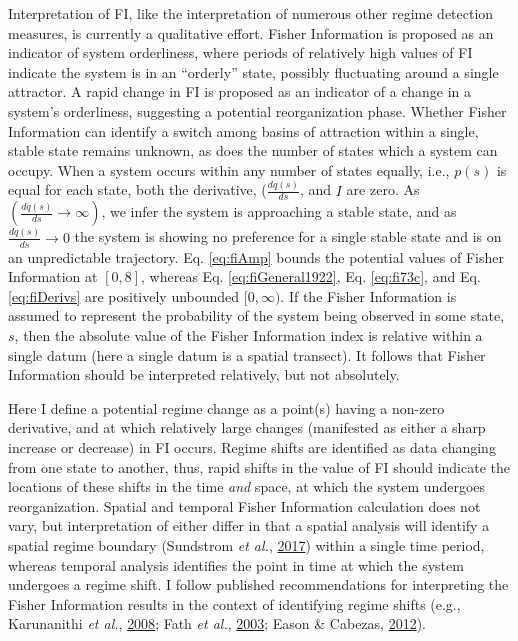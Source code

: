 \documentclass[12pt,twoside,openany]{reedthesis}
\begin{document}
Interpretation of FI, like the interpretation of numerous other regime detection measures, is currently a qualitative effort. Fisher Information is proposed as an indicator of system orderliness, where periods of relatively high values of FI indicate the system is in an ``orderly'' state, possibly fluctuating around a single attractor. A rapid change in FI is proposed as an indicator of a change in a system's orderliness, suggesting a potential reorganization phase. Whether Fisher Information can identify a switch among basins of attraction within a single, stable state remains unknown, as does the number of states which a system can occupy. When a system occurs within any number of states equally, i.e., \(p(s)\) is equal for each state, both the derivative, (\(\frac{dq(s)}{ds}\), and \(I\) are zero. As \((\frac{dq(s)}{ds} \rightarrow \infty)\), we infer the system is approaching a stable state, and as \(\frac{dq(s)}{ds} \rightarrow 0\) the system is showing no preference for a single stable state and is on an unpredictable trajectory. Eq. \eqref{eq:fiAmp} bounds the potential values of Fisher Information at \([0, 8]\), whereas Eq. \eqref{eq:fiGeneral1922}, Eq. \eqref{eq:fi73c}, and Eq. \eqref{eq:fiDerivs} are positively unbounded \([0, \infty)\). If the Fisher Information is assumed to represent the probability of the system being observed in some state, \(s\), then the absolute value of the Fisher Information index is relative within a single datum (here a single datum is a spatial transect). It follows that Fisher Information should be interpreted relatively, but not absolutely.

Here I define a potential regime change as a point(s) having a non-zero derivative, and at which relatively large changes (manifested as either a sharp increase or decrease) in FI occurs. Regime shifts are identified as data changing from one state to another, thus, rapid shifts in the value of FI should indicate the locations of these shifts in the time \emph{and} space, at which the system undergoes reorganization. Spatial and temporal Fisher Information calculation does not vary, but interpretation of either differ in that a spatial analysis will identify a spatial regime boundary (Sundstrom \emph{et al.}, \protect\hyperlink{ref-sundstrom2017detecting}{2017}) within a single time period, whereas temporal analysis identifies the point in time at which the system undergoes a regime shift. I follow published recommendations for interpreting the Fisher Information results in the context of identifying regime shifts (e.g., Karunanithi \emph{et al.}, \protect\hyperlink{ref-karunanithi_detection_2008}{2008}; Fath \emph{et al.}, \protect\hyperlink{ref-fath_regime_2003}{2003}; Eason \& Cabezas, \protect\hyperlink{ref-eason_evaluating_2012}{2012}).
\end{document}
